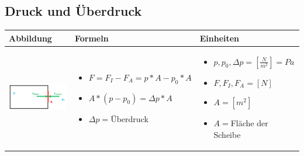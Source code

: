 \newpage
\vspace*{-3cm}
\subsection{Druck und Überdruck}				%
\begin{table}[h!]
	\begin{tabular}{ | m{6cm} | m{6cm} | m{6cm} | }
		\hline
		Abbildung & Formeln & Einheiten \\ \hline
		\midrule
		\begin{minipage}{.3\textwidth}
			\includegraphics[width=4.5cm]{Figures/Ueberdruck}
		\end{minipage}
		&
		\begin{itemize}
			\item $F=F_{I}-F_{A}=p*A-p_{0}*A$
			\item $A*(p-p_{0})=\Delta p*A$
			
			\item {\color{red}$\Delta p=$Überdruck} 
		\end{itemize}
		& 
		\begin{itemize}
			\item $p,p_{0},\Delta p=[\frac{N}{m^2}]=Pa$
			\item $F,F_{I},F_{A}=[N]$
			\item $A=[m^2]$ 
			\item $A=$Fläche der Scheibe 	
		\end{itemize}
		\\ \hline
	\end{tabular}
\end{table}

